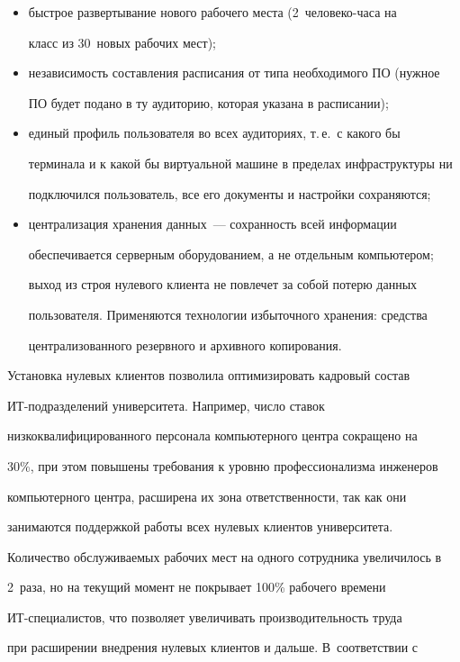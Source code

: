 \begin{itemize}
\item быстрое развертывание нового рабочего места (2~че\-ло\-ве\-ко-ча\-са на 

класс из 30~новых рабочих мест);

\item независимость составления расписания от типа необходимого ПО (нужное 

ПО будет подано в ту аудиторию, которая указана в расписании);

\item единый профиль пользователя во всех аудиториях, т.\,е.\ с какого бы 

терминала и к какой бы виртуальной машине в пределах инфраструктуры ни 

подключился пользователь, все его документы и настройки сохраняются;

\item централизация хранения данных~--- сохранность всей информации 

обеспечивается серверным оборудованием, а не отдельным компьютером; 

выход из строя нулевого клиента не повлечет за собой потерю данных 

пользователя. Применяются технологии избыточного хранения: средства 

централизованного резервного и архивного копирования. 

\end{itemize}



  Установка нулевых клиентов позволила оптимизировать кадровый состав 

ИТ-подразделений университета. Например, число ставок 

низкоквалифицированного персонала компьютерного центра сокращено на 

30\%, при этом повышены требования к уровню профессионализма инженеров 

компьютерного центра, расширена их зона ответственности, так как они 

занимаются поддержкой работы всех нулевых клиентов университета. 

Количество обслуживаемых рабочих мест на одного сотрудника увеличилось в 

2~раза, но на текущий момент не покрывает 100\% рабочего времени 

  ИТ-спе\-циа\-ли\-стов, что позволяет увеличивать производительность труда 

при расширении внедрения нулевых клиентов и дальше. В~соответствии с 


